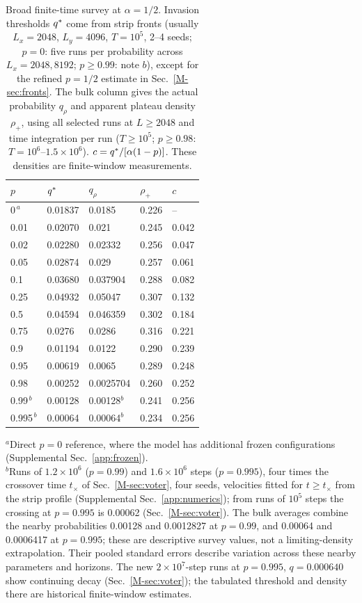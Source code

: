 \begin{table}
\caption{Broad finite-time survey at $\alpha=1/2$. Invasion thresholds
$q^{*}$ come from strip fronts (usually $L_x=2048$, $L_y=4096$, $T=10^5$,
2--4 seeds; $p=0$: five runs per probability across $L_x=2048,8192$;
$p\ge0.99$: note $b$), except for the refined $p=1/2$
estimate in Sec.~\ref{M-sec:fronts}. The bulk column gives the actual probability
$q_\rho$ and apparent plateau density $\rho_+$, using all selected runs at
$L\ge2048$ and time integration per run ($T\ge10^5$;
$p\ge0.98$: $T=10^6$--$1.5\times10^6$).
$c=q^{*}/[\alpha(1-p)]$. These densities are finite-window measurements.}
\label{tab:line}
\begin{ruledtabular}
\begin{tabular}{lllll}
$p$ & $q^{*}$ & $q_\rho$ & $\rho_+$ & $c$ \\
\hline
$0^{\,a}$ & 0.01837 & 0.0185 & 0.226 & -- \\
0.01 & 0.02070 & 0.021 & 0.245 & 0.042 \\
0.02 & 0.02280 & 0.02332 & 0.256 & 0.047 \\
0.05 & 0.02874 & 0.029 & 0.257 & 0.061 \\
0.1 & 0.03680 & 0.037904 & 0.288 & 0.082 \\
0.25 & 0.04932 & 0.05047 & 0.307 & 0.132 \\
0.5 & 0.04594 & 0.046359 & 0.302 & 0.184 \\
0.75 & 0.0276 & 0.0286 & 0.316 & 0.221 \\
0.9 & 0.01194 & 0.0122 & 0.290 & 0.239 \\
0.95 & 0.00619 & 0.0065 & 0.289 & 0.248 \\
0.98 & 0.00252 & 0.0025704 & 0.260 & 0.252 \\
0.99$^{\,b}$ & 0.00128 & 0.00128$^{b}$ & 0.241 & 0.256 \\
0.995$^{\,b}$ & 0.00064 & 0.00064$^{b}$ & 0.234 & 0.256 \\
\end{tabular}
\end{ruledtabular}
\begin{flushleft}\footnotesize
$^{a}$Direct $p=0$ reference, where the model has additional frozen configurations
(Supplemental Sec.~\ref{app:frozen}).\\
$^{b}$Runs of $1.2\times10^6$ ($p = 0.99$) and $1.6\times10^6$ steps ($p = 0.995$), four times the
crossover time $t_\times$ of Sec.~\ref{M-sec:voter}, four seeds, velocities fitted for $t\ge t_\times$
from the strip profile (Supplemental Sec.~\ref{app:numerics}); from runs of $10^5$ steps the
crossing at $p = 0.995$ is 0.00062 (Sec.~\ref{M-sec:voter}).
The bulk averages combine the nearby probabilities 0.00128 and 0.0012827 at
$p=0.99$, and 0.00064 and 0.0006417 at $p=0.995$; these are descriptive
survey values, not a limiting-density extrapolation. Their pooled standard
errors describe variation across these nearby parameters and horizons.
The new $2\times10^7$-step runs at $p=0.995$, $q=0.000640$ show
continuing decay (Sec.~\ref{M-sec:voter}); the tabulated threshold and density
there are historical finite-window estimates.
\end{flushleft}
\end{table}



